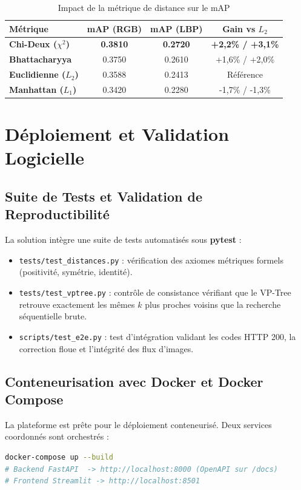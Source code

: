 \begin{table}[H]
    \centering
    \caption{Impact de la métrique de distance sur le mAP}
    \label{tab:distance_impact_compact}
    \begin{tabular}{lccc}
        \toprule
        \textbf{Métrique} & \textbf{mAP (RGB)} & \textbf{mAP (LBP)} & \textbf{Gain vs $L_2$} \\
        \midrule
        \textbf{Chi-Deux ($\chi^2$)} & \textbf{0.3810} & \textbf{0.2720} & \textbf{+2,2\% / +3,1\%} \\
        \textbf{Bhattacharyya}       & 0.3750          & 0.2610          & +1,6\% / +2,0\% \\
        \textbf{Euclidienne ($L_2$)} & 0.3588          & 0.2413          & Référence \\
        \textbf{Manhattan ($L_1$)}   & 0.3420          & 0.2280          & -1,7\% / -1,3\% \\
        \bottomrule
    \end{tabular}
\end{table}

\section{Déploiement et Validation Logicielle}

\subsection{Suite de Tests et Validation de Reproductibilité}
La solution intègre une suite de tests automatisés sous \textbf{pytest} :
\begin{itemize}[nosep]
    \item \texttt{tests/test\_distances.py} : vérification des axiomes métriques formels (positivité, symétrie, identité).
    \item \texttt{tests/test\_vptree.py} : contrôle de consistance vérifiant que le VP-Tree retrouve exactement les mêmes $k$ plus proches voisins que la recherche séquentielle brute.
    \item \texttt{scripts/test\_e2e.py} : test d'intégration validant les codes HTTP 200, la correction floue et l'intégrité des flux d'images.
\end{itemize}

\subsection{Conteneurisation avec Docker et Docker Compose}
La plateforme est prête pour le déploiement conteneurisé. Deux services coordonnés sont orchestrés :
\begin{lstlisting}[language=bash, caption={Démarrage instantané sous Docker}]
docker-compose up --build
# Backend FastAPI  -> http://localhost:8000 (OpenAPI sur /docs)
# Frontend Streamlit -> http://localhost:8501
\end{lstlisting}

